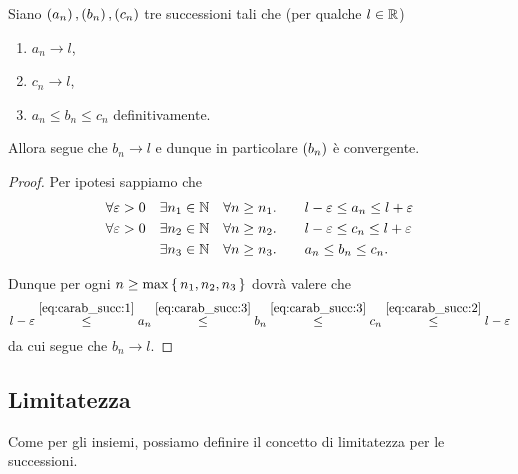 \begin{theorem}
     \label{th:carab_succ}
    Siano $\seqn*{a}, \seqn*{b}, \seqn*{c}$ tre successioni tali che (per qualche $l \in \mathbb{R}$)\begin{enumerate}[label={(\roman*)}]
        \item $a_n \to l$,
        \item $c_n \to l$,
        \item $a_n \leq b_n \leq c_n$ definitivamente.
    \end{enumerate}
    Allora segue che $b_n \to l$ e dunque in particolare $\seqn*{b}$ è convergente.
\end{theorem}
\begin{proof}
    Per ipotesi sappiamo che \begin{align}
        \forall \varepsilon > 0 \quad &\exists n_1 \in \mathbb{N} \quad \forall n \geq n_1. \quad {}&&l-\varepsilon \leq a_n \leq l+\varepsilon \label{eq:carab_succ:1}\\ 
        \forall \varepsilon > 0 \quad &\exists n_2 \in \mathbb{N} \quad \forall n \geq n_2. \quad {}&&l-\varepsilon \leq c_n \leq l+\varepsilon \label{eq:carab_succ:2}\\
        &\exists n_3 \in \mathbb{N} \quad \forall n \geq n_3. \quad {}&&a_n \leq b_n \leq c_n. \label{eq:carab_succ:3}
    \end{align}

    Dunque per ogni $n \geq \max \left\{\,n_1, n_2, n_3\,\right\}$ dovrà valere che \[
        l-\varepsilon \stackrel{\eqref{eq:carab_succ:1}}{\leq} a_n \stackrel{\eqref{eq:carab_succ:3}}{\leq} b_n \stackrel{\eqref{eq:carab_succ:3}}{\leq} c_n \stackrel{\eqref{eq:carab_succ:2}}{\leq} l - \varepsilon
    \] da cui segue che $b_n \to l$.
\end{proof}

\subsection{Limitatezza}

Come per gli insiemi, possiamo definire il concetto di limitatezza per le successioni.

